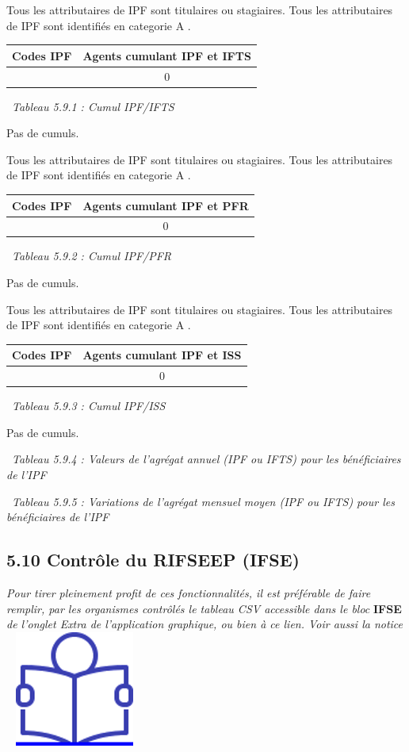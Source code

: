 Tous les attributaires de IPF sont titulaires ou stagiaires. Tous les
attributaires de IPF sont identifiés en categorie A .

\begin{longtable}[]{@{}cc@{}}
\toprule
Codes IPF & Agents cumulant IPF et IFTS\tabularnewline
\midrule
\endhead
& 0\tabularnewline
\bottomrule
\end{longtable}

~\emph{Tableau 5.9.1 : Cumul IPF/IFTS}

Pas de cumuls.

Tous les attributaires de IPF sont titulaires ou stagiaires. Tous les
attributaires de IPF sont identifiés en categorie A .

\begin{longtable}[]{@{}cc@{}}
\toprule
Codes IPF & Agents cumulant IPF et PFR\tabularnewline
\midrule
\endhead
& 0\tabularnewline
\bottomrule
\end{longtable}

~\emph{Tableau 5.9.2 : Cumul IPF/PFR}

Pas de cumuls.

Tous les attributaires de IPF sont titulaires ou stagiaires. Tous les
attributaires de IPF sont identifiés en categorie A .

\begin{longtable}[]{@{}cc@{}}
\toprule
Codes IPF & Agents cumulant IPF et ISS\tabularnewline
\midrule
\endhead
& 0\tabularnewline
\bottomrule
\end{longtable}

~\emph{Tableau 5.9.3 : Cumul IPF/ISS}

Pas de cumuls.

~\emph{Tableau 5.9.4 : Valeurs de l'agrégat annuel (IPF ou IFTS) pour
les bénéficiaires de l'IPF}

~\emph{Tableau 5.9.5 : Variations de l'agrégat mensuel moyen (IPF ou
IFTS) pour les bénéficiaires de l'IPF}

\hypertarget{controle-du-rifseep-ifse}{%
\subsection{5.10 Contrôle du RIFSEEP
(IFSE)}\label{controle-du-rifseep-ifse}}

\emph{Pour tirer pleinement profit de ces fonctionnalités, il est
préférable de faire remplir, par les organismes contrôlés le tableau CSV
accessible dans le bloc} \textbf{IFSE} \emph{de l'onglet Extra de
l'application graphique, ou bien à ce lien. Voir aussi la notice} ~
\href{../Docs/Notices/fiche_tableau_ifse.odt}{\includegraphics{icones/Notice.png}}

